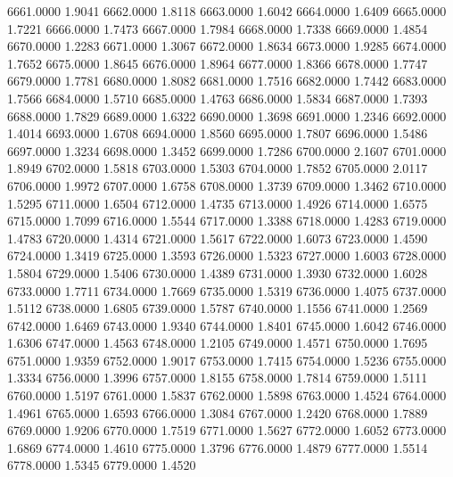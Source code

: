 6661.0000      1.9041
6662.0000      1.8118
6663.0000      1.6042
6664.0000      1.6409
6665.0000      1.7221
6666.0000      1.7473
6667.0000      1.7984
6668.0000      1.7338
6669.0000      1.4854
6670.0000      1.2283
6671.0000      1.3067
6672.0000      1.8634
6673.0000      1.9285
6674.0000      1.7652
6675.0000      1.8645
6676.0000      1.8964
6677.0000      1.8366
6678.0000      1.7747
6679.0000      1.7781
6680.0000      1.8082
6681.0000      1.7516
6682.0000      1.7442
6683.0000      1.7566
6684.0000      1.5710
6685.0000      1.4763
6686.0000      1.5834
6687.0000      1.7393
6688.0000      1.7829
6689.0000      1.6322
6690.0000      1.3698
6691.0000      1.2346
6692.0000      1.4014
6693.0000      1.6708
6694.0000      1.8560
6695.0000      1.7807
6696.0000      1.5486
6697.0000      1.3234
6698.0000      1.3452
6699.0000      1.7286
6700.0000      2.1607
6701.0000      1.8949
6702.0000      1.5818
6703.0000      1.5303
6704.0000      1.7852
6705.0000      2.0117
6706.0000      1.9972
6707.0000      1.6758
6708.0000      1.3739
6709.0000      1.3462
6710.0000      1.5295
6711.0000      1.6504
6712.0000      1.4735
6713.0000      1.4926
6714.0000      1.6575
6715.0000      1.7099
6716.0000      1.5544
6717.0000      1.3388
6718.0000      1.4283
6719.0000      1.4783
6720.0000      1.4314
6721.0000      1.5617
6722.0000      1.6073
6723.0000      1.4590
6724.0000      1.3419
6725.0000      1.3593
6726.0000      1.5323
6727.0000      1.6003
6728.0000      1.5804
6729.0000      1.5406
6730.0000      1.4389
6731.0000      1.3930
6732.0000      1.6028
6733.0000      1.7711
6734.0000      1.7669
6735.0000      1.5319
6736.0000      1.4075
6737.0000      1.5112
6738.0000      1.6805
6739.0000      1.5787
6740.0000      1.1556
6741.0000      1.2569
6742.0000      1.6469
6743.0000      1.9340
6744.0000      1.8401
6745.0000      1.6042
6746.0000      1.6306
6747.0000      1.4563
6748.0000      1.2105
6749.0000      1.4571
6750.0000      1.7695
6751.0000      1.9359
6752.0000      1.9017
6753.0000      1.7415
6754.0000      1.5236
6755.0000      1.3334
6756.0000      1.3996
6757.0000      1.8155
6758.0000      1.7814
6759.0000      1.5111
6760.0000      1.5197
6761.0000      1.5837
6762.0000      1.5898
6763.0000      1.4524
6764.0000      1.4961
6765.0000      1.6593
6766.0000      1.3084
6767.0000      1.2420
6768.0000      1.7889
6769.0000      1.9206
6770.0000      1.7519
6771.0000      1.5627
6772.0000      1.6052
6773.0000      1.6869
6774.0000      1.4610
6775.0000      1.3796
6776.0000      1.4879
6777.0000      1.5514
6778.0000      1.5345
6779.0000      1.4520
